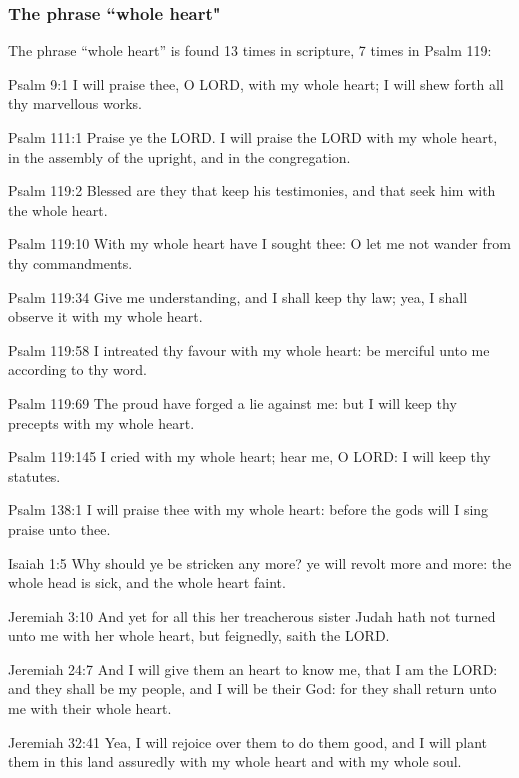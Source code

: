 \subsubsection{The phrase ``whole heart"}

The phrase ``whole heart'' is found 13 times in scripture, 7 times in Psalm 119:
\begin{compactenum}
    \item Psalm 9:1 I will praise thee, O LORD, with my whole heart; I will shew forth all thy marvellous works.
    \item Psalm 111:1 Praise ye the LORD. I will praise the LORD with my whole heart, in the assembly of the upright, and in the congregation.
    \item Psalm 119:2 Blessed are they that keep his testimonies, and that seek him with the whole heart.
    \item Psalm 119:10 With my whole heart have I sought thee: O let me not wander from thy commandments.
    \item Psalm 119:34 Give me understanding, and I shall keep thy law; yea, I shall observe it with my whole heart.
    \item Psalm 119:58  I intreated thy favour with my whole heart: be merciful unto me according to thy word.
    \item Psalm 119:69 The proud have forged a lie against me: but I will keep thy precepts with my whole heart.
    \item Psalm 119:145 I cried with my whole heart; hear me, O LORD: I will keep thy statutes.
    \item Psalm 138:1 I will praise thee with my whole heart: before the gods will I sing praise unto thee.
    \item Isaiah 1:5 Why should ye be stricken any more? ye will revolt more and more: the whole head is sick, and the whole heart faint.
    \item Jeremiah 3:10 And yet for all this her treacherous sister Judah hath not turned unto me with her whole heart, but feignedly, saith the LORD.
    \item Jeremiah 24:7 And I will give them an heart to know me, that I am the LORD: and they shall be my people, and I will be their God: for they shall return unto me with their whole heart.
    \item Jeremiah 32:41 Yea, I will rejoice over them to do them good, and I will plant them in this land assuredly with my whole heart and with my whole soul.
\end{compactenum}